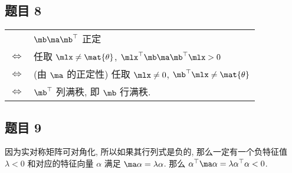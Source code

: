 \subsection*{ 题目 8 }
\begin{solution}
    \begin{table}[h]
        \begin{tabular}{rl}
            {} & $\mb \ma \mb^\top$ 正定 \\
            $\Leftrightarrow$ & 任取 $\mlx \not= \mat{\theta}$, $\mlx^\top \mb \ma \mb^\top \mlx > 0$ \\
            $\Leftrightarrow$ & (由 $\ma$ 的正定性) 任取 $\mlx \not= 0$, $\mb^\top \mlx \not= \mat{\theta}$ \\
            $\Leftrightarrow$ & $\mb^\top$ 列满秩, 即 $\mb$ 行满秩.
        \end{tabular}
    \end{table}
\end{solution}

\subsection*{ 题目 9 }
\begin{solution}
因为实对称矩阵可对角化, 所以如果其行列式是负的, 那么一定有一个负特征值 $\lambda < 0$ 和对应的特征向量 $\alpha$ 满足 $\ma \alpha = \lambda \alpha$. 那么 $\alpha^\top \ma \alpha = \lambda \alpha^\top \alpha < 0$.
\end{solution}
